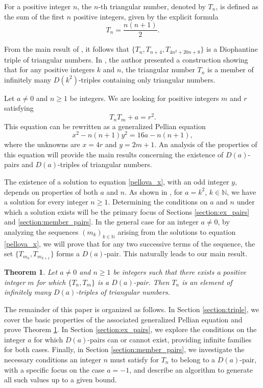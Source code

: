 \documentclass[12pt]{amsart}
\newtheorem{theorem}{Theorem}
\theoremstyle{definition}
\begin{document}
For a positive integer $n$, the $n$-th triangular number, denoted by $T_n$, is defined as the sum of the first $n$ positive integers, given by the explicit formula
$$T_n=\frac{n(n+1)}{2}.$$

From the main result of \cite{mnde}, it follows that  
$\{T_n,T_{n+4},T_{4n^2+20n+8}\}$  
is a Diophantine triple of triangular numbers. In \cite{mbt_triangular}, the author presented a construction showing that for any positive integers $k$ and $n$, the triangular number $T_n$ is a member of infinitely many $D(k^2)$-triples containing only triangular numbers.

Let $a\neq 0$ and $n\geq 1$ be integers. We are looking for positive integers $m$ and $r$ satisfying
$$T_nT_m+a=r^2.$$
This equation can be rewritten as a generalized Pellian equation 
\begin{equation}\label{pellova_x}
    x^2-n(n+1)y^2=16a-n(n+1),
\end{equation}
where the unknowns are $x=4r$ and $y=2m+1$. An analysis of the properties of this equation will provide the main results concerning the existence of $D(a)$-pairs and $D(a)$-triples of triangular numbers. 

The existence of a solution to equation \eqref{pellova_x}, with an odd integer $y$, depends on properties of both $a$ and $n$. As shown in \cite{mbt_triangular}, for $a=k^2$, $k\in\mathbb{N}$, we have a solution for every integer $n\geq 1$. Determining the conditions on $a$ and $n$ under which a solution exists will be the primary focus of Sections \ref{section:ex_pairs} and \ref{section:member_pairs}. In the general case for an integer $a\neq 0$, by analyzing the sequences $(m_k)_{k \in \mathbb{N}}$ arising from the solutions to equation \eqref{pellova_x}, we will prove that for any two successive terms of the sequence, the set $\{T_{m_k}, T_{m_{k+1}}\}$ forms a $D(a)$-pair. This naturally leads to our main result.

\begin{theorem}\label{tm_2}
Let $a\neq 0$ and $n\geq 1$ be integers such that there exists a positive integer $m$ for which $\{T_n,T_m\}$ is a $D(a)$-pair. Then $T_n$ is an element of infinitely many $D(a)$-triples of triangular numbers.
\end{theorem}

The remainder of this paper is organized as follows. In Section \ref{section:triple}, we cover the basic properties of the associated generalized Pellian equation and prove Theorem \ref{tm_2}. In Section \ref{section:ex_pairs}, we explore the conditions on the integer $a$ for which $D(a)$-pairs can or cannot exist, providing infinite families for both cases. Finally, in Section \ref{section:member_pairs}, we investigate the necessary conditions an integer $n$ must satisfy for $T_n$ to belong to a $D(a)$-pair, with a specific focus on the case $a=-1$, and describe an algorithm to generate all such values up to a given bound.
\end{document}
